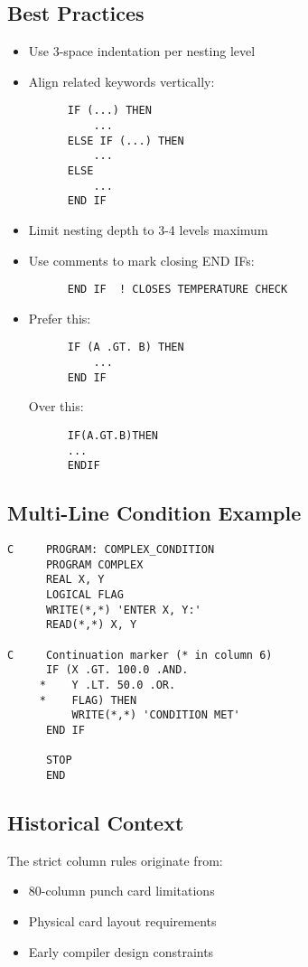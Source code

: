 \documentclass{book}
\begin{document}
\subsection*{Best Practices}
\begin{itemize}
    \item Use 3-space indentation per nesting level
    \item Align related keywords vertically:
    \begin{verbatim}
      IF (...) THEN
          ...
      ELSE IF (...) THEN
          ...
      ELSE
          ...
      END IF
    \end{verbatim}
    \item Limit nesting depth to 3-4 levels maximum
    \item Use comments to mark closing END IFs:
    \begin{verbatim}
      END IF  ! CLOSES TEMPERATURE CHECK
    \end{verbatim}
    \item Prefer this:
    \begin{verbatim}
      IF (A .GT. B) THEN
          ...
      END IF
    \end{verbatim}
    Over this:
    \begin{verbatim}
      IF(A.GT.B)THEN
      ...
      ENDIF
    \end{verbatim}
\end{itemize}

\subsection*{Multi-Line Condition Example}
\begin{verbatim}
C     PROGRAM: COMPLEX_CONDITION
      PROGRAM COMPLEX
      REAL X, Y
      LOGICAL FLAG
      WRITE(*,*) 'ENTER X, Y:'
      READ(*,*) X, Y
      
C     Continuation marker (* in column 6)
      IF (X .GT. 100.0 .AND.
     *    Y .LT. 50.0 .OR.
     *    FLAG) THEN
          WRITE(*,*) 'CONDITION MET'
      END IF
      
      STOP
      END
\end{verbatim}

\subsection*{Historical Context}
The strict column rules originate from:
\begin{itemize}
    \item 80-column punch card limitations
    \item Physical card layout requirements
    \item Early compiler design constraints
\end{itemize}
\end{document}
